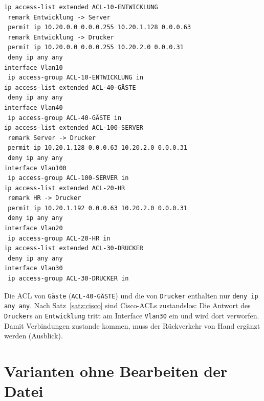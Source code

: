 \documentclass[a4paper,12pt, twoside]{report}
\theoremstyle{definition}
\begin{document}
\begin{lstlisting}[language={}, numbers=none, basicstyle=\ttfamily\scriptsize, caption={Cisco-ACLs für das Beispiel}]
ip access-list extended ACL-10-ENTWICKLUNG
 remark Entwicklung -> Server
 permit ip 10.20.0.0 0.0.0.255 10.20.1.128 0.0.0.63
 remark Entwicklung -> Drucker
 permit ip 10.20.0.0 0.0.0.255 10.20.2.0 0.0.0.31
 deny ip any any
interface Vlan10
 ip access-group ACL-10-ENTWICKLUNG in
ip access-list extended ACL-40-GÄSTE
 deny ip any any
interface Vlan40
 ip access-group ACL-40-GÄSTE in
ip access-list extended ACL-100-SERVER
 remark Server -> Drucker
 permit ip 10.20.1.128 0.0.0.63 10.20.2.0 0.0.0.31
 deny ip any any
interface Vlan100
 ip access-group ACL-100-SERVER in
ip access-list extended ACL-20-HR
 remark HR -> Drucker
 permit ip 10.20.1.192 0.0.0.63 10.20.2.0 0.0.0.31
 deny ip any any
interface Vlan20
 ip access-group ACL-20-HR in
ip access-list extended ACL-30-DRUCKER
 deny ip any any
interface Vlan30
 ip access-group ACL-30-DRUCKER in
\end{lstlisting}

Die ACL von \texttt{Gäste} (\texttt{ACL-40-GÄSTE}) und die von \texttt{Drucker} enthalten nur \texttt{deny ip any any}. Nach Satz~\ref{satz:cisco} sind Cisco-ACLs zustandslos: Die Antwort des \texttt{Drucker}s an \texttt{Entwicklung} tritt am Interface \texttt{Vlan30} ein und wird dort verworfen. Damit Verbindungen zustande kommen, muss der Rückverkehr von Hand ergänzt werden (Ausblick).

\section{Varianten ohne Bearbeiten der Datei}
\end{document}
